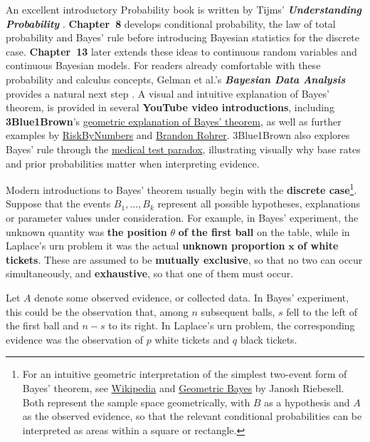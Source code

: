 An excellent introductory Probability book is written by Tijms' \textit{\textbf{Understanding Probability}} \cite{tijms2012}. \textbf{Chapter~8} develops conditional probability, the law of total probability and Bayes' rule before introducing Bayesian statistics for the discrete case. \textbf{Chapter~13} later extends these ideas to continuous random variables and continuous Bayesian models. For readers already comfortable with these probability and calculus concepts, Gelman et al.'s \textit{\textbf{Bayesian Data Analysis}} provides a natural next step \cite{gelman2013bayesian}. 
A visual and intuitive explanation of Bayes' theorem, is provided in several \textbf{YouTube video introductions}, including \textbf{3Blue1Brown}'s \href{https://youtu.be/HZGCoVF3YvM}{geometric explanation of Bayes' theorem}, as well as further examples by \href{https://youtu.be/NLKWLBJ-b9E}{RiskByNumbers} and \href{https://youtu.be/5NMxiOGL39M}{Brandon Rohrer}. 3Blue1Brown also explores Bayes' rule through the \href{https://youtu.be/lG4VkPoG3ko}{medical test paradox}, illustrating visually why base rates and prior probabilities matter when interpreting evidence.

\vspace{2mm}

Modern introductions to Bayes' theorem usually begin with the
\textbf{discrete case}\footnote{ For an intuitive geometric interpretation of the simplest two-event form of Bayes' theorem, see \href{https://en.wikipedia.org/wiki/Bayes\%27_theorem}{Wikipedia} and \href{https://tikz.net/geometric-bayes/}{Geometric Bayes} by Janosh Riebesell. Both represent the sample space geometrically, with $B$ as a hypothesis and $A$ as the observed evidence, so that the relevant conditional probabilities can be interpreted as areas within a square or rectangle. }. Suppose that the events $B_1,\ldots,B_k$ represent all possible hypotheses, explanations or parameter values under consideration. For example, in Bayes' experiment, the unknown quantity was \textbf{the position} $\theta$ \textbf{of the first ball} on the table, while in Laplace's urn problem it was the actual \textbf{unknown proportion} $\mathbf{x}$ \textbf{of white tickets}. These are assumed to be \textbf{mutually exclusive}, so that no two can occur simultaneously, and \textbf{exhaustive}, so that one of them must occur. 

Let $A$ denote some observed evidence, or collected data. In Bayes' experiment, this could be the observation that, among $n$ subsequent balls, $s$ fell to the left of the first ball and $n-s$ to its right. In Laplace's urn problem, the corresponding evidence was the observation of $p$ white tickets and $q$ black tickets. 

